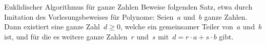 \documentclass{algblatt}
\begin{document}
\begin{aufgabe}{Euklidischer Algorithmus für ganze Zahlen}
Beweise folgenden Satz, etwa durch Imitation des Vorlesungsbeweises für
Polynome: Seien~$a$ und~$b$ ganze Zahlen. Dann existiert eine ganze Zahl~$d
\geq 0$, welche ein gemeinsamer Teiler von~$a$ und~$b$ ist, und für die es
weitere ganze Zahlen~$r$ und~$s$ mit~$d = r \cdot a + s \cdot b$ gibt.
\end{aufgabe}
 
\end{document}
